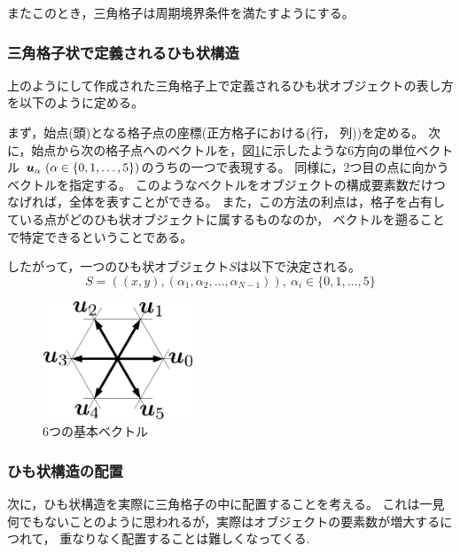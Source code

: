 またこのとき，三角格子は周期境界条件を満たすようにする。

\subsubsection{三角格子状で定義されるひも状構造}

上のようにして作成された三角格子上で定義されるひも状オブジェクトの表し方を以下のように定める。

まず，始点(頭)となる格子点の座標(正方格子における(行， 列))を定める。
次に，始点から次の格子点へのベクトルを，図\ref{fig:unitvec}に示したような6方向の単位ベクトル
$\mbox{\boldmath \(u\)}_{\alpha}\ (\alpha \in \{0, 1, \dots , 5\})$のうちの一つで表現する。
同様に，2つ目の点に向かうベクトルを指定する。
このようなベクトルをオブジェクトの構成要素数だけつなげれば，全体を表すことができる。
また，この方法の利点は，格子を占有している点がどのひも状オブジェクトに属するものなのか，
ベクトルを遡ることで特定できるということである。

したがって，一つのひも状オブジェクト$S$は以下で決定される。
$$ S = ((x, y), (\alpha_{1},  \alpha_{2}, \dots , \alpha_{N-1}) ), \ \alpha_{i} \in \{0, 1, \dots , 5\}$$

\begin{figure}[H]
  \begin{center}
    \includegraphics[width=0.4\textwidth]{../img/unitvec.pdf}
    \caption{6つの基本ベクトル}
    \label{fig:unitvec}
  \end{center}
\end{figure}

\subsubsection{ひも状構造の配置}

次に，ひも状構造を実際に三角格子の中に配置することを考える。
これは一見何でもないことのように思われるが，実際はオブジェクトの要素数が増大するにつれて，
重なりなく配置することは難しくなってくる.

